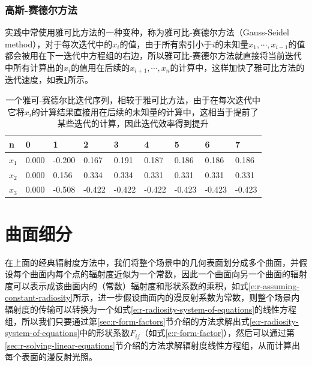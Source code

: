 \subsubsection{高斯-赛德尔方法}\label{sec:r-gauss-seidel-iteration}
实践中常使用雅可比方法的一种变种\cite{a:ModelingtheInteractionofLightBetweenDiffuseSurfaces}，称为雅可比-赛德尔方法（Gauss-Seidel method），对于每次迭代中的$x_i$的值，由于所有索引小于$i$的未知量$x_1,\cdots,x_{i-1}$的值都会被用在下一迭代中方程组的右边，所以雅可比-赛德尔方法就直接将当前迭代中所有计算出的$x_i$的值用在后续的$x_{i+1},\cdots,x_n$的计算中，这样加快了雅可比方法的迭代速度，如表\ref{t:r-jacobi-seidel-iteration}所示。

\begin{table}
\caption{一个雅可-赛德尔比迭代序列，相较于雅可比方法，由于在每次迭代中它将$x_i$的计算结果直接用在后续的未知量的计算中，这相当于提前了某些迭代的计算，因此迭代效率得到提升}
\label{t:r-jacobi-seidel-iteration}
\begin{tabular}{p{}|p{}|p{}|p{}|p{}|p{}|p{}|p{}|p{}}
\hline 
   n & 0 & 1 & 2 & 3& 4& 5 &6 & 7 \\
    \hline  
  $x_1$ & 0.000 & -0.200 & 0.167  & 0.191  & 0.187  & 0.186  & 0.186  & 0.186\\
  $x_2$ & 0.000 & 0.156  & 0.334  & 0.334  & 0.331  & 0.331  & 0.331  & 0.331\\
  $x_3$ & 0.000 & -0.508 & -0.422 & -0.422 & -0.422 & -0.423 & -0.423 & -0.423\\
 \hline 
\end{tabular}
\end{table}








\section{曲面细分}\label{sec:r-meshing}
在上面的经典辐射度方法中，我们将整个场景中的几何表面划分成多个曲面，并假设每个曲面内每个点的辐射度近似为一个常数，因此一个曲面向另一个曲面的辐射度可以表示成该曲面内的（常数）辐射度和形状系数的乘积，如式\ref{e:r-assuming-constant-radiosity}所示，进一步假设曲面内的漫反射系数为常数，则整个场景内辐射度的传输可以转换为一个如式\ref{e:r-radiosity-system-of-equations}的线性方程组，所以我们只要通过第\ref{sec:r-form-factors}节介绍的方法求解出式\ref{e:r-radiosity-system-of-equations}中的形状系数$F_{ij}$（如式\ref{e:r-form-factor}），然后可以通过第\ref{sec:r-solving-linear-equations}节介绍的方法求解辐射度线性方程组，从而计算出每个表面的漫反射光照。

